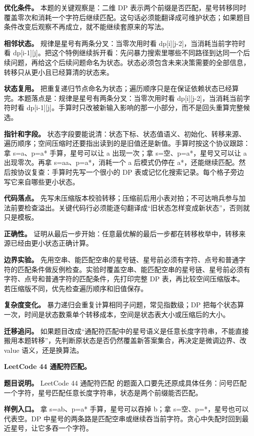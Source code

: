 \textbf{优化条件。} 本题的关键观察是：二维 DP 表示两个前缀是否匹配，星号转移同时覆盖零次和消耗一个字符后继续匹配。这句话必须能翻译成可维护状态；如果题目条件改变后观察不再成立，就不能继续套原来的写法。

\textbf{相邻状态。} 规律是星号有两条分叉：当零次用时看 dp[i][j-2]，当消耗当前字符时看 dp[i-1][j]。把这个特例继续拆开看：先问暴力搜索里哪些不同路径到达同一个后续问题，再给这个后续问题命名为状态。状态必须包含未来决策需要的全部信息，转移只从更小且已经算清的状态来。

\textbf{状态复用。} 把重复递归节点命名为状态；遍历顺序只是在保证依赖状态已经算完。本题落点是：规律是星号有两条分叉：当零次用时看 dp[i][j-2]，当消耗当前字符时看 dp[i-1][j]。手算时只改被新输入影响的那一小部分，而不是回头重算完整候选。

\textbf{指针和字段。} 状态字段要能说清：状态下标、状态值语义、初始化、转移来源、遍历顺序；空间压缩时还要指出读到的是旧值还是新值。手算时按这个协议跟踪：拿 s=a、p=a* 手算，星号可以让 a 出现一次；拿 s=空、p=a*，星号又可以让 a 出现零次。再拿 s=aa、p=a*，消耗一个 a 后模式仍停在 a*，还能继续匹配。然后按协议复查：手算时先写一个很小的 DP 表或记忆化搜索记录。每个格子旁边写它来自哪些更小状态。

\textbf{代码落点。} 先写未压缩版本校验转移；压缩前后用小表对拍；不可达哨兵参与加法前要检查溢出。关键代码行必须能逐句翻译成“旧状态怎样变成新状态”，否则就只是模板。

\textbf{正确性。} 证明从最后一步开始：任意最优解的最后一步都在转移枚举中，转移来源已经由更小状态正确计算。

\textbf{边界实验。} 先用空串、能匹配空串的星号链、星号前必须有字符、点号和普通字符的匹配条件做反例检查。实验时覆盖空串、能匹配空串的星号链、星号前必须有字符、点号和普通字符的匹配条件，先打印完整 DP 表，再比较空间压缩版本。若压缩版不同，优先检查遍历顺序和旧值保存。

\textbf{复杂度变化。} 暴力递归会重复计算相同子问题，常见指数级；DP 把每个状态算一次，时间是状态数乘单个转移成本，空间是状态表大小或压缩后的大小。

\textbf{迁移追问。} 如果题目改成“通配符匹配中的星号语义是任意长度字符串，不能直接搬用本题转移”，先判断原状态是否仍然覆盖新答案集合，再决定是微调边界、改 value 语义，还是换算法。

\noindent\textbf{LeetCode 44 通配符匹配。}

\textbf{题目说明。} LeetCode 44 通配符匹配 的题面入口要先还原成具体任务：问号匹配一个字符，星号匹配任意长度字符串，状态是两个前缀能否匹配。

\textbf{样例入口。} 拿 s=ab、p=a* 手算，星号可以吞掉 b；拿 s=空、p=*，星号也可以代表空。DP 中星号的两条路是匹配空串或继续吞当前字符。贪心中失配时回到最近星号，让它多吞一个字符。

